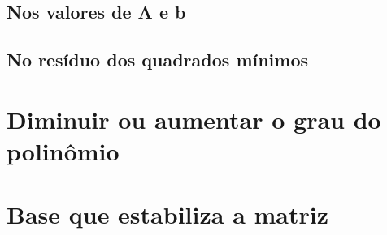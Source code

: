 \section{Nos valores de A e b}

\section{No resíduo dos quadrados mínimos}

\chapter{Diminuir ou aumentar o grau do polinômio}

\chapter{Base que estabiliza a matriz}

